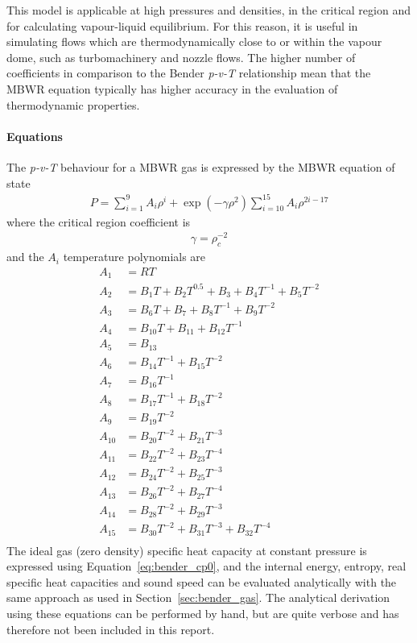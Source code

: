 This model is applicable at high pressures and densities, in the critical region and
for calculating vapour-liquid equilibrium. For this reason, it is useful in
simulating flows which are thermodynamically close to or within the vapour dome,
such as turbomachinery and nozzle flows. The higher number of coefficients in
comparison to the Bender \textit{p-v-T} relationship mean that the MBWR equation
typically has higher accuracy in the evaluation of thermodynamic properties.

\paragraph{Equations}
The \textit{p-v-T} behaviour for a MBWR gas is expressed by the MBWR equation of state \cite{jacobsen1973thermodynamic}
\begin{align}
P = \sum_{i=1}^9 A_i \rho^i + \exp{\left(-\gamma \rho^2\right)}\sum_{i=10}^{15} A_i \rho^{2i-17}
\end{align}
where the critical region coefficient is
\begin{align}
\gamma = \rho_c^{-2}
\end{align}
and the \(A_i\) temperature polynomials are
\begin{align*}
A_1 &= RT\\
A_2 &= B_1 T + B_2 T^{0.5} + B_3 + B_4 T^{-1} + B_5 T^{-2}\\
A_3 &= B_6 T + B_7 + B_8 T^{-1} + B_9 T^{-2}\\
A_4 &= B_{10} T + B_{11} + B_{12} T^{-1}\\
A_5 &= B_{13}\\
A_6 &= B_{14} T^{-1} + B_{15} T^{-2}\\
A_7 &= B_{16} T^{-1}\\
A_8 &= B_{17} T^{-1} + B_{18} T^{-2}\\
A_9 &= B_{19} T^{-2}\\
A_{10} &= B_{20} T^{-2} + B_{21} T^{-3}\\
A_{11} &= B_{22} T^{-2} + B_{23} T^{-4}\\
A_{12} &= B_{24} T^{-2} + B_{25} T^{-3}\\
A_{13} &= B_{26} T^{-2} + B_{27} T^{-4}\\
A_{14} &= B_{28} T^{-2} + B_{29} T^{-3}\\
A_{15} &= B_{30} T^{-2} + B_{31} T^{-3} + B_{32} T^{-4}\\
\end{align*}
The ideal gas (zero density) specific heat capacity at constant pressure is
expressed using Equation~\ref{eq:bender_cp0}, and the internal energy, entropy,
real specific heat capacities and sound speed can be evaluated analytically with
the same approach as used in Section~\ref{sec:bender_gas}. The analytical
derivation using these equations can be performed by hand, but are quite verbose
and has therefore not been included in this report.

